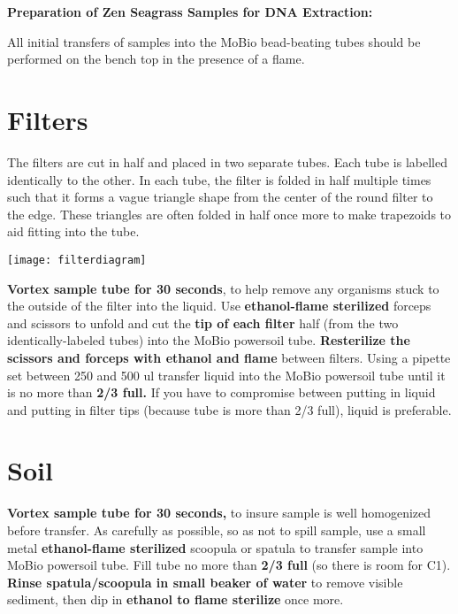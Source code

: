 \documentclass[a4paper,12pt]{article} %
\begin{document}
\begin{center} \textbf{Preparation of Zen Seagrass Samples for DNA Extraction:} \end{center}

All initial transfers of samples into the MoBio bead-beating tubes should be performed on the bench top in the presence of a flame.



\section{Filters}

The filters are cut in half and placed in two separate tubes. Each tube is labelled identically to the other. In each tube, the filter is folded in half multiple times such that it forms a vague triangle shape from the center of the round filter to the edge. These triangles are often folded in half once more to make trapezoids to aid fitting into the tube.
 
\texttt{[image: filterdiagram]}

\textbf{Vortex sample tube for 30 seconds}, to help remove any organisms stuck to the outside of the filter into the liquid. Use \textbf{ethanol-flame sterilized} forceps and scissors to unfold and cut the \textbf{tip of each filter} half (from the two identically-labeled tubes) into the MoBio powersoil tube. \textbf{Resterilize the scissors and forceps with ethanol and flame} between filters. Using a pipette set between 250 and 500 ul transfer liquid into the MoBio powersoil tube until it is no more than \textbf{2/3 full.} If you have to compromise between putting in liquid and putting in filter tips (because tube is more than 2/3 full), liquid is preferable.


\section{Soil}

\textbf{Vortex sample tube for 30 seconds,} to insure sample is well homogenized before transfer. As carefully as possible, so as not to spill sample, use a small metal \textbf{ethanol-flame sterilized} scoopula or spatula to transfer sample into MoBio powersoil tube. Fill tube no more than \textbf{2/3 full} (so there is room for C1). \textbf{Rinse spatula/scoopula in small beaker of water} to remove visible sediment, then dip in \textbf{ethanol to flame sterilize} once more.
\end{document}
